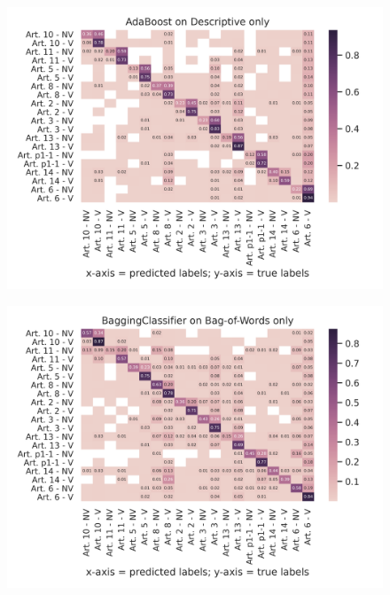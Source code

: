 \documentclass{article}
\begin{document}
\begin{figure}[!htb]
    \centering
    \includegraphics[scale=0.7]{data/analysis/cm/multiclass_cm_test_adaboost_descriptive_only.png}  
\end{figure}
\begin{figure}[!htb]
    \centering
    \includegraphics[scale=0.7]{data/analysis/cm/multiclass_cm_test_baggingclassifier_bag-of-words_only.png}  
\end{figure}
\end{document}
